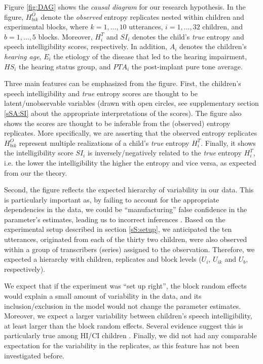 Figure \ref{fig:DAG} shows the \textit{causal diagram} for our research hypothesis. In the figure, $H^{O}_{bik}$ denote the \textit{observed} entropy replicates nested within children and experimental blocks, where $k=1,\dots,10$ utterances, $i=1,\dots,32$ children, and $b=1,\dots,5$ blocks. Moreover, $H^{T}_{i}$ and $SI_{i}$ denotes the child's \textit{true} entropy and speech intelligibility scores, respectively. In addition, $A_{i}$ denotes the children's \textit{hearing age}, $E_{i}$ the etiology of the disease that led to the hearing impairment, $HS_{i}$ the hearing status group, and $PTA_{i}$ the post-implant pure tone average.

Three main features can be emphasized from the figure. First, the children's speech intelligibility and \textit{true} entropy scores are thought to be latent/unobservable variables \cite{Everitt_1984} (drawn with open circles, see supplementary section \ref{sSA:SI} about the appropriate interpretations of the scores). The figure also shows the scores are thought to be inferable from the (observed) entropy replicates. More specifically, we are asserting that the observed entropy replicates $H^{O}_{bik}$ represent multiple realizations of a child's \textit{true} entropy $H^{T}_{i}$. Finally, it shows the intelligibility score $SI_{i}$ is inversely/negatively related to the \textit{true} entropy $H^{T}_{i}$, i.e. the lower the intelligibility the higher the entropy and vice versa, as expected from our the theory. 

Second, the figure reflects the expected hierarchy of variability in our data. This is particularly important as, by failing to account for the appropriate dependencies in the data, we could be ``manufacturing'' false confidence in the parameter's estimates, leading us to incorrect inferences \cite{McElreath_2020}. Based on the experimental setup described in section \ref{sS:setup}, we anticipated the ten utterances, originated from each of the thirty two children, were also observed within a group of transcribers (series) assigned to the observation. Therefore, we expected a hierarchy with children, replicates and block levels ($U_{i}$, $U_{ik}$ and $U_{b}$, respectively).

We expect that if the experiment was ``set up right'', the block random effects would explain a small amount of variability in the data, and its inclusion/exclusion in the model would not change the parameter estimates. Moreover, we expect a larger variability between children's speech intelligibility, at least larger than the block random effects. Several evidence suggest this is particularly true among HI/CI children \cite{Young_et_al_2002, Peng_et_al_2004, Montag_et_al_2014, Castellanos_et_al_2014, Yanbay_et_al_2014, Nittrouer_et_al_2014, Freeman_et_al_2017}. Finally, we did not had any comparable expectation for the variability in the replicates, as this feature has not been investigated before.

